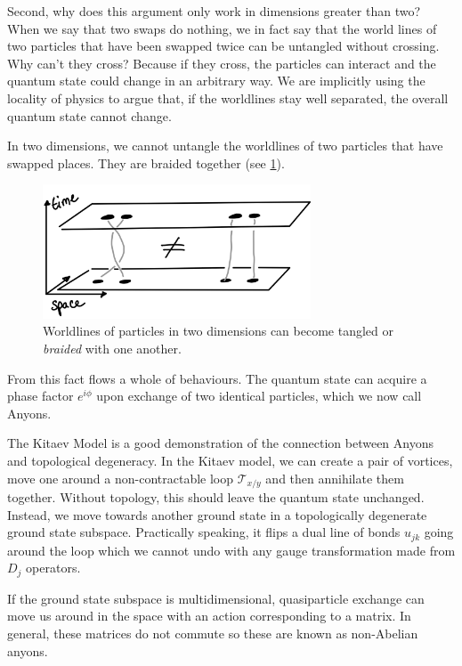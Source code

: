 Second, why does this argument only work in dimensions greater than two? When we say that two swaps do nothing, we in fact say that the world lines of two particles that have been swapped twice can be untangled without crossing. Why can't they cross? Because if they cross, the particles can interact and the quantum state could change in an arbitrary way. We are implicitly using the locality of physics to argue that, if the worldlines stay well separated, the overall quantum state cannot change.

In two dimensions, we cannot untangle the worldlines of two particles that have swapped places. They are braided together (see \cref{fig:braiding}).

\begin{figure}
\hypertarget{fig:braiding}{%
\centering
\includegraphics[width=0.71\textwidth,height=\textheight]{figure_code/amk_chapter/braiding.png}
\caption{Worldlines of particles in two dimensions can become tangled or \emph{braided} with one another.}\label{fig:braiding}
}
\end{figure}

From this fact flows a whole of behaviours. The quantum state can acquire a phase factor \(e^{i\phi}\) upon exchange of two identical particles, which we now call Anyons.

The Kitaev Model is a good demonstration of the connection between Anyons and topological degeneracy. In the Kitaev model, we can create a pair of vortices, move one around a non-contractable loop \(\mathcal{T}_{x/y}\) and then annihilate them together. Without topology, this should leave the quantum state unchanged. Instead, we move towards another ground state in a topologically degenerate ground state subspace. Practically speaking, it flips a dual line of bonds \(u_{jk}\) going around the loop which we cannot undo with any gauge transformation made from \(D_j\) operators.

If the ground state subspace is multidimensional, quasiparticle exchange can move us around in the space with an action corresponding to a matrix. In general, these matrices do not commute so these are known as non-Abelian anyons.


